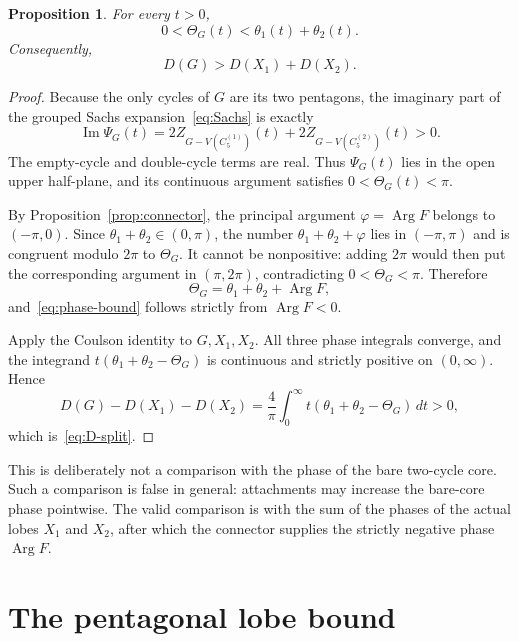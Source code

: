 \documentclass[11pt]{article}
\newtheorem{proposition}[theorem]{Proposition}
\theoremstyle{remark}
\newcommand{\Arg}{\operatorname{Arg}}
\begin{document}
\begin{proposition}\label{prop:phase}
For every $t>0$,
\begin{equation}\label{eq:phase-bound}
 0<\Theta_G(t)<\theta_1(t)+\theta_2(t).
\end{equation}
Consequently,
\begin{equation}\label{eq:D-split}
 D(G)>D(X_1)+D(X_2).
\end{equation}
\end{proposition}

\begin{proof}
Because the only cycles of $G$ are its two pentagons, the imaginary part of
the grouped Sachs expansion~\eqref{eq:Sachs} is exactly
\begin{equation}\label{eq:whole-upper}
 \operatorname{Im}\Psi_G(t)
 =2Z_{G-V(C_5^{(1)})}(t)+2Z_{G-V(C_5^{(2)})}(t)>0.
\end{equation}
The empty-cycle and double-cycle terms are real.  Thus $\Psi_G(t)$ lies in
the open upper half-plane, and its continuous argument satisfies
$0<\Theta_G(t)<\pi$.

By Proposition~\ref{prop:connector}, the principal argument
$\varphi=\Arg F$ belongs to $(-\pi,0)$.  Since
$\theta_1+\theta_2\in(0,\pi)$, the number
$\theta_1+\theta_2+\varphi$ lies in $(-\pi,\pi)$ and is congruent modulo
$2\pi$ to $\Theta_G$.  It cannot be nonpositive: adding $2\pi$ would then
put the corresponding argument in $(\pi,2\pi)$, contradicting
$0<\Theta_G<\pi$.  Therefore
\begin{equation}\label{eq:branch-identity}
 \Theta_G=\theta_1+\theta_2+\Arg F,
\end{equation}
and~\eqref{eq:phase-bound} follows strictly from $\Arg F<0$.

Apply the Coulson identity to $G,X_1,X_2$.  All three phase integrals converge,
and the integrand
$t(\theta_1+\theta_2-\Theta_G)$ is continuous and strictly positive on
$(0,\infty)$.  Hence
\[
 D(G)-D(X_1)-D(X_2)
 =\frac4\pi\int_0^\infty
 t(\theta_1+\theta_2-\Theta_G)\,dt>0,
\]
which is~\eqref{eq:D-split}.
\end{proof}

This is deliberately not a comparison with the phase of the bare two-cycle
core.  Such a comparison is false in general: attachments may increase the
bare-core phase pointwise.  The valid comparison is with the sum of the
phases of the actual lobes $X_1$ and $X_2$, after which the connector supplies
the strictly negative phase $\Arg F$.

\section{The pentagonal lobe bound}
\end{document}
